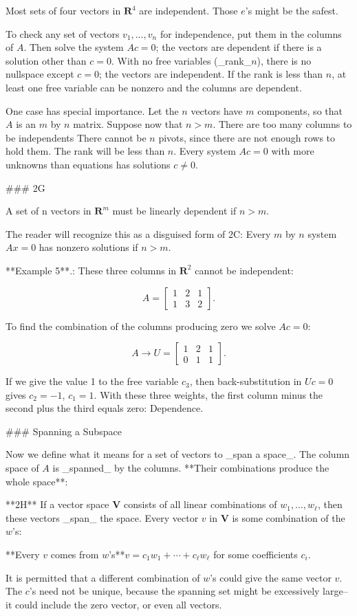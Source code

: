 Most sets of four vectors in \(\mathbf{R}^{4}\) are independent. Those \(e\)'s might be the safest.

To check any set of vectors \(v_{1},\ldots,v_{n}\) for independence, put them in the columns of \(A\). Then solve the system \(Ac=0\); the vectors are dependent if there is a solution other than \(c=0\). With no free variables (_rank_\(n\)), there is no nullspace except \(c=0\); the vectors are independent. If the rank is less than \(n\), at least one free variable can be nonzero and the columns are dependent.

One case has special importance. Let the \(n\) vectors have \(m\) components, so that \(A\) is an \(m\) by \(n\) matrix. Suppose now that \(n>m\). There are too many columns to be independents There cannot be \(n\) pivots, since there are not enough rows to hold them. The rank will be less than \(n\). Every system \(Ac=0\) with more unknowns than equations has solutions \(c\neq 0\).

### 2G

A set of n vectors in \(\mathbf{R}^{m}\) must be linearly dependent if \(n>m\).

The reader will recognize this as a disguised form of 2C: Every \(m\) by \(n\) system \(Ax=0\) has nonzero solutions if \(n>m\).

**Example 5**.: These three columns in \(\mathbf{R}^{2}\) cannot be independent:

\[A=\begin{bmatrix}1&2&1\\ 1&3&2\end{bmatrix}.\]

To find the combination of the columns producing zero we solve \(Ac=0\):

\[A\to U=\begin{bmatrix}1&2&1\\ 0&1&1\end{bmatrix}.\]

If we give the value 1 to the free variable \(c_{3}\), then back-substitution in \(Uc=0\) gives \(c_{2}=-1\), \(c_{1}=1\). With these three weights, the first column minus the second plus the third equals zero: Dependence.

### Spanning a Subspace

Now we define what it means for a set of vectors to _span a space_. The column space of \(A\) is _spanned_ by the columns. **Their combinations produce the whole space**:

**2H** If a vector space \(\mathbf{V}\) consists of all linear combinations of \(w_{1},\ldots,w_{\ell}\), then these vectors _span_ the space. Every vector \(v\) in \(\mathbf{V}\) is some combination of the \(w\)'s:

**Every \(v\) comes from \(w\)'s**\(v=c_{1}w_{1}+\cdots+c_{\ell}w_{\ell}\) for some coefficients \(c_{i}\).

It is permitted that a different combination of \(w\)'s could give the same vector \(v\). The \(c\)'s need not be unique, because the spanning set might be excessively large--it could include the zero vector, or even all vectors.

 